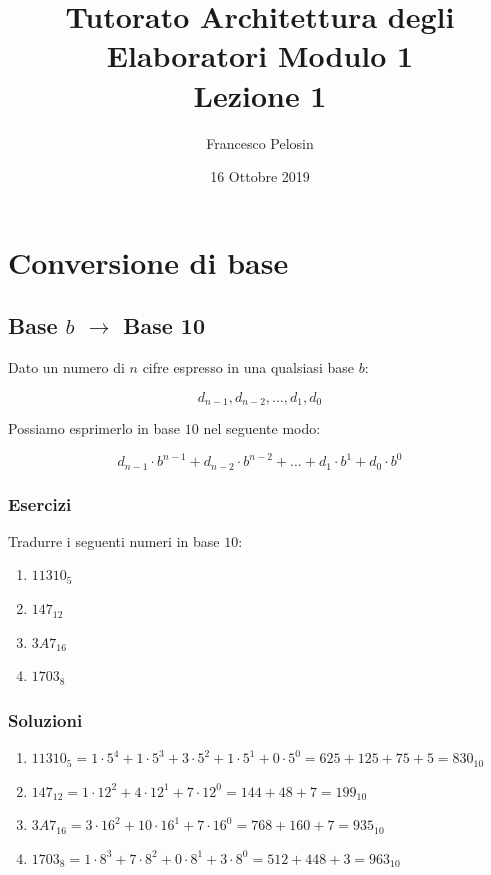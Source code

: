 \documentclass{article}
\title{Tutorato Architettura degli Elaboratori Modulo 1 \\ Lezione 1}
\author{Francesco Pelosin}
\date{16 Ottobre 2019}
\begin{document}
\maketitle

\section{Conversione di base}
\subsection{Base $b$ $\rightarrow$ Base 10}

Dato un numero di $n$ cifre espresso in una qualsiasi base $b$:

$$d_{n-1}, d_{n-2}, \dots, d_{1}, d_{0}$$

\noindent Possiamo esprimerlo in base $10$ nel seguente modo:

$$d_{n-1}\cdot b^{n-1} + d_{n-2}\cdot b^{n-2} + \dots + d_{1} \cdot b^{1} + d_{0}\cdot b^{0}$$

\subsubsection*{Esercizi}

Tradurre i seguenti numeri in base $10$:
\begin{enumerate}
    \item $11310_{5}$
    \item $147_{12}$
    \item $3A7_{16}$
    \item $1703_{8}$
\end{enumerate}

\subsubsection*{Soluzioni}
\begin{enumerate}
    \item $11310_{5}=1\cdot 5^{4}+1\cdot 5^{3}+3\cdot 5^{2}+1\cdot5^{1}+0\cdot 5^{0}=625+125+75+5=830_{10}$
    \item $147_{12}=1\cdot 12^{2}+4\cdot 12^{1}+7\cdot 12^{0}=144+48+7=199_{10}$
    \item $3A7_{16}=3\cdot 16^{2}+10\cdot 16^{1}+7\cdot 16^{0}=768+160+7=935_{10}$
    \item $1703_{8}=1\cdot 8^{3}+7\cdot 8^{2}+0\cdot 8^{1}+3\cdot 8^{0}=512+448+3=963_{10}$
\end{enumerate}
\end{document}
